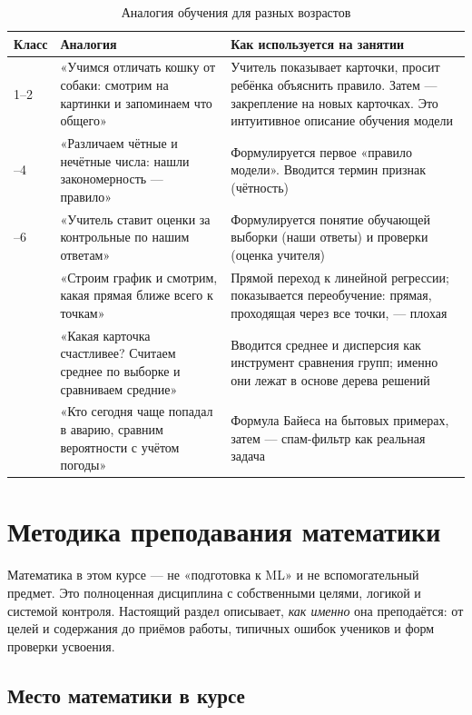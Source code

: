\documentclass[12pt,a4paper]{article}
\begin{document}
\begin{table}[H]
\centering
\caption{Аналогия обучения для разных возрастов}
\label{tab:analogy}
\begin{tabular}{L{1.6cm}L{6.4cm}L{7.2cm}}
\toprule
\textbf{Класс} & \textbf{Аналогия} & \textbf{Как используется на занятии}\\
--2 & «Учимся отличать кошку от собаки:
смотрим на картинки и запоминаем
что общего» & Учитель показывает карточки, просит ребёнка
объяснить правило. Затем --- закрепление на
новых карточках. Это интуитивное описание
обучения модели\\
--4 & «Различаем чётные и нечётные числа:
нашли закономерность --- правило» & Формулируется первое
«правило модели». Вводится термин
признак (чётность)\\
--6 & «Учитель ставит оценки за
контрольные по нашим ответам» &
Формулируется понятие обучающей выборки
(наши ответы) и проверки (оценка учителя)\\
 & «Строим график и смотрим, какая
прямая ближе всего к точкам» &
Прямой переход к линейной регрессии;
показывается переобучение: прямая,
проходящая через все точки, --- плохая\\
 & «Какая карточка счастливее?
Считаем среднее по выборке и сравниваем
средние» & Вводится среднее и дисперсия как
инструмент сравнения групп; именно они
лежат в основе дерева решений\\
 & «Кто сегодня чаще попадал в
аварию, сравним вероятности с учётом
погоды» & Формула Байеса на бытовых примерах,
затем --- спам-фильтр как реальная задача\\
\bottomrule
\end{tabular}
\end{table}

\newpage
\section{Методика преподавания математики}

Математика в этом курсе --- не «подготовка к ML» и не вспомогательный
предмет. Это полноценная дисциплина с собственными целями, логикой
и системой контроля. Настоящий раздел описывает, \emph{как именно}
она преподаётся: от целей и содержания до приёмов работы, типичных
ошибок учеников и форм проверки усвоения.

\subsection{Место математики в курсе}
\end{document}
